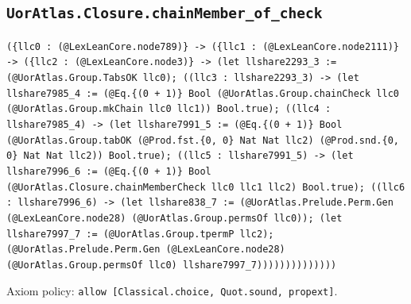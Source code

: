 \documentclass[11pt]{article}
\begin{document}
\subsection*{\texttt{UorAtlas.Closure.chainMember\_of\_check}}
\noindent\texttt{(\{llc0 : (@LexLeanCore.node789)\} -> (\{llc1 : (@LexLeanCore.node2111)\} -> (\{llc2 : (@LexLeanCore.node3)\} -> (let llshare2293\_3 := (@UorAtlas.Group.TabsOK llc0); ((llc3 : llshare2293\_3) -> (let llshare7985\_4 := (@Eq.\{(0 + 1)\} Bool (@UorAtlas.Group.chainCheck llc0 (@UorAtlas.Group.mkChain llc0 llc1)) Bool.true); ((llc4 : llshare7985\_4) -> (let llshare7991\_5 := (@Eq.\{(0 + 1)\} Bool (@UorAtlas.Group.tabOK (@Prod.fst.\{0, 0\} Nat Nat llc2) (@Prod.snd.\{0, 0\} Nat Nat llc2)) Bool.true); ((llc5 : llshare7991\_5) -> (let llshare7996\_6 := (@Eq.\{(0 + 1)\} Bool (@UorAtlas.Closure.chainMemberCheck llc0 llc1 llc2) Bool.true); ((llc6 : llshare7996\_6) -> (let llshare838\_7 := (@UorAtlas.Prelude.Perm.Gen (@LexLeanCore.node28) (@UorAtlas.Group.permsOf llc0)); (let llshare7997\_7 := (@UorAtlas.Group.tpermP llc2); (@UorAtlas.Prelude.Perm.Gen (@LexLeanCore.node28) (@UorAtlas.Group.permsOf llc0) llshare7997\_7))))))))))))))}\par
\noindent Axiom policy: \texttt{allow [Classical.choice, Quot.sound, propext]}.\par
\end{document}
